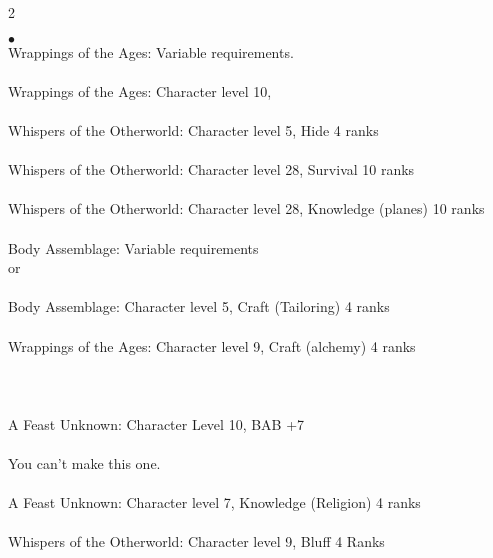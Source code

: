 \begin{multicols}{2}
\begin{small}
\begin{list}{$\bullet$}{\itemspace}
\\
Wrappings of the Ages: Variable requirements.\\
\\
Wrappings of the Ages: Character level 10, \\
\\
Whispers of the Otherworld: Character level 5, Hide 4 ranks\\
\\
Whispers of the Otherworld: Character level 28, Survival 10 ranks\\
\\
Whispers of the Otherworld: Character level 28, Knowledge (planes) 10 ranks\\
\\
Body Assemblage: Variable requirements\\
or \\
\\
Body Assemblage: Character level 5, Craft (Tailoring) 4 ranks\\
\\
Wrappings of the Ages: Character level 9, Craft (alchemy) 4 ranks\\
\\
\\
\\
A Feast Unknown: Character Level 10, BAB +7\\
\\
You can't make this one.\\
\\
A Feast Unknown: Character level 7, Knowledge (Religion) 4 ranks\\
\\
Whispers of the Otherworld: Character level 9, Bluff 4 Ranks\\
\\

\end{list}
\end{small}
\end{multicols}
